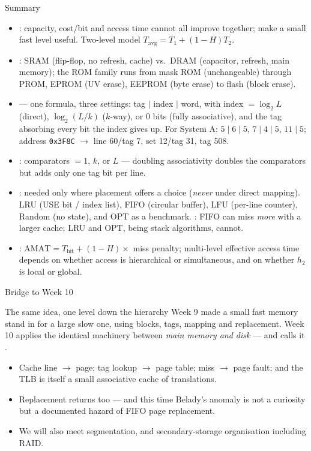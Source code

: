 \documentclass[aspectratio=169]{beamer}
\begin{document}
\begin{frame}{Summary}
  \footnotesize
  \begin{itemize}
    \item {}: capacity, cost/bit and access time cannot all
      improve together;  make a small fast
      level useful. Two-level model
      $T_{\text{avg}} = T_1 + (1-H)T_2$.
    \item {}: SRAM (flip-flop, no refresh, cache) vs.\ DRAM
      (capacitor, refresh, main memory); the ROM family runs from mask ROM
      (unchangeable) through PROM, EPROM (UV erase), EEPROM (byte erase) to
      flash (block erase).
    \item {} --- one formula, three settings: tag $\mid$ index
      $\mid$ word, with index $= \log_2 L$ (direct), $\log_2(L/k)$ ($k$-way),
      or 0 bits (fully associative), and the tag absorbing every bit the index
      gives up. For System A: $5\mid6\mid5$, $7\mid4\mid5$, $11\mid5$; address
      \texttt{0x3F8C} $\to$ line 60/tag 7, set 12/tag 31, tag 508.
    \item {}: comparators $= 1$, $k$, or $L$ --- doubling
      associativity doubles the comparators but adds only one tag bit per line.
    \item {}: needed only where placement offers a choice
      (\emph{never} under direct mapping). LRU (USE bit / index list), FIFO
      (circular buffer), LFU (per-line counter), Random (no state), and OPT as
      a benchmark. : FIFO can miss \emph{more} with a
      larger cache; LRU and OPT, being stack algorithms, cannot.
    \item {}: $\text{AMAT} = T_{\text{hit}} + (1-H)\times$ miss
      penalty; multi-level effective access time depends on whether access is
      hierarchical or simultaneous, and on whether $h_2$ is local or global.
  \end{itemize}
\end{frame}

\begin{frame}{Bridge to Week 10}
  \begin{exampleblock}{The same idea, one level down the hierarchy}
    Week 9 made a small fast memory stand in for a large slow one, using
    blocks, tags, mapping and replacement. Week 10 applies the identical
    machinery between \emph{main memory and disk} --- and calls it
    .
  \end{exampleblock}
  \begin{itemize}
    \item Cache line $\to$ page; tag lookup $\to$ page table; miss $\to$ page
      fault; and the TLB is itself a small associative cache of translations.
    \item Replacement returns too --- and this time Belady's anomaly is not a
      curiosity but a documented hazard of FIFO page replacement.
    \item We will also meet segmentation, and secondary-storage organisation
      including RAID.
  \end{itemize}
\end{frame}
\end{document}
